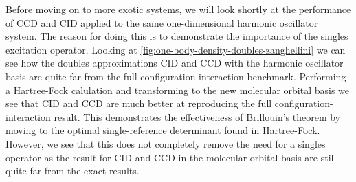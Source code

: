         Before moving on to more exotic systems, we will look shortly at the
        performance of CCD and CID applied to the same one-dimensional harmonic
        oscillator system.
        The reason for doing this is to demonstrate the importance of the
        singles excitation operator.
        Looking at \autoref{fig:one-body-density-doubles-zanghellini} we can see
        how the doubles approximations CID and CCD with the harmonic oscillator
        basis are quite far from the full configuration-interaction benchmark.
        Performing a Hartree-Fock calulation and transforming to the new
        molecular orbital basis we see that CID and CCD are much better at
        reproducing the full configuration-interaction result.
        This demonstrates the effectiveness of Brillouin's theorem by moving to
        the optimal single-reference determinant found in Hartree-Fock.
        However, we see that this does not completely remove the need for a
        singles operator as the result for CID and CCD in the molecular orbital
        basis are still quite far from the exact results.

